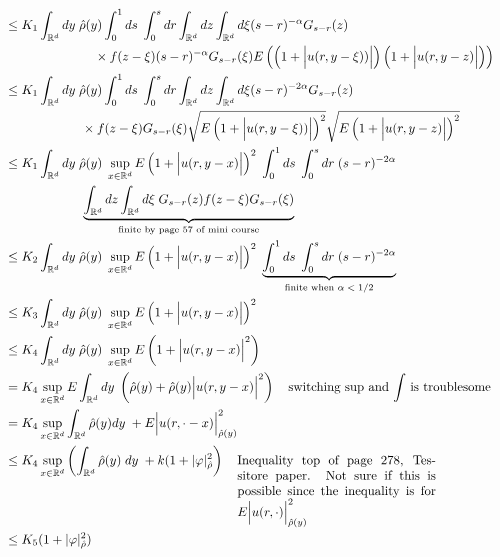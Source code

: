 \documentclass[a4paper,11pt]{article}
\theoremstyle{plain}
\theoremstyle{definition}
\numberwithin{NQ}{section}
\numberwithin{LQ}{section}
\numberwithin{ZQ}{section}
\begin{document}
\begin{align*}
    \\ &\le K_1 \int_{\mathbb R^d}dy \; \hat\rho(y)\int_0^1ds \; \int_0^s dr \int_{\mathbb R^d} dz \int_{\mathbb R^d} d\xi (s-r)^{-\alpha}G_{s-r}(z) \\ & \quad \quad \quad \quad \quad \quad \quad  \times f(z-\xi)(s-r)^{-\alpha}G_{s-r}(\xi)E\left(\left(1+\Big|u(r,y-\xi))\Big|\right)\left(1+\Big|u(r,y-z)\Big|\right)\right)
    \\ &\le K_1 \int_{\mathbb R^d}dy \; \hat\rho(y)\int_0^1ds \; \int_0^s dr \int_{\mathbb R^d} dz \int_{\mathbb R^d} d\xi (s-r)^{-2\alpha}G_{s-r}(z) \\ & \quad \quad \quad \quad \quad \quad  \times f(z-\xi)G_{s-r}(\xi)\sqrt{E\left(1+\Big|u(r,y-\xi))\Big|\right)^2}\sqrt{E\left(1+\Big|u(r,y-z)\Big|\right)^2}
    \\ &\le K_1 \int_{\mathbb R^d}dy \; \hat\rho(y) \; \sup_{x \in \mathbb R^d}E\left(1+\Big|u(r,y-x)\Big|\right)^2\;\int_0^1ds \; \int_0^s dr \;(s-r)^{-2\alpha}   \\ & \quad \quad \quad \quad \quad \quad   \underbrace{\int_{\mathbb R^d} dz \int_{\mathbb R^d} d\xi \;G_{s-r}(z)f(z-\xi)G_{s-r}(\xi)}_{\text{finite by page 57 of mini course}}
    \\ &\le K_2 \int_{\mathbb R^d}dy \; \hat\rho(y) \; \sup_{x \in \mathbb R^d}E\left(1+\Big|u(r,y-x)\Big|\right)^2\;\underbrace{\int_0^1ds \; \int_0^s dr \;(s-r)^{-2\alpha}}_{\text{finite when $\alpha < 1/2$}}
    \\ &\le K_3 \int_{\mathbb R^d}dy \; \hat\rho(y) \; \sup_{x \in \mathbb R^d}E\left(1+\Big|u(r,y-x)\Big|\right)^2
    \\&\le K_4 \int_{\mathbb R^d}dy \; \hat\rho(y) \; \sup_{x \in \mathbb R^d}E\left(1+\Big|u(r,y-x)\Big|^2\right)
    \\ &= K_4 \sup_{x \in \mathbb R^d} E\int_{\mathbb R^d}dy \; \left(\hat\rho(y)+\hat\rho(y)\Big|u(r,y-x)\Big|^2\right) \quad \text{switching sup and $\int$ is troublesome}
    \\ &= K_4 \sup_{x \in \mathbb R^d} \int_{\mathbb R^d} \hat\rho(y)dy \; +E\Big|u(r,\cdot-x)\Big|_{\hat\rho(y)}^2 
     \\ &\le K_4 \sup_{x \in \mathbb R^d}\left( \int_{\mathbb R^d}\hat\rho(y)\; dy\;+k(1+|\varphi|_{\hat\rho}^2 \right) \quad \begin{minipage}[t]{0.45\textwidth}
Inequality top of page 278, Tessitore paper. Not sure if this is possible since the inequality is for $E\Big|u(r,\cdot)\Big|_{\hat\rho(y)}^2$ 
\end{minipage}
     \\ &\le K_5(1+|\varphi|_{\hat\rho}^2)
\end{align*}
\end{document}
